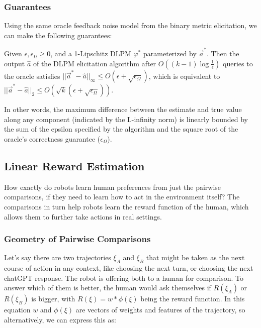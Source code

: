 \documentclass[
  letterpaper,
  numbers=noenddot,
  DIV=11]{scrreprt}
\theoremstyle{plain}
\theoremstyle{definition}
\theoremstyle{plain}
\theoremstyle{remark}
\begin{document}
\subsubsection*{Guarantees}\label{guarantees-1}

Using the same oracle feedback noise model from the binary metric
elicitation, we can make the following guarantees:

\begin{tcolorbox}[colframe=.grey, title=\faPenSquare \enspace Proposition]

\label{prop-prop_dlpm}
Given \(\epsilon, \epsilon_\Omega \geq 0\), and a 1-Lipschitz DLPM
\(\varphi^*\) parameterized by \(\vec{a}^*\). Then the output
\(\hat{a}\) of the DLPM elicitation algorithm after
\(O((k-1)\log\frac{1}{\epsilon})\) queries to the oracle satisfies
\(||\vec{a}^* - \hat{a}||_\infty \leq O(\epsilon + \sqrt{\epsilon_\Omega})\),
which is equivalent to
\(||\vec{a}^* - \hat{a}||_2 \leq O(\sqrt{k}(\epsilon + \sqrt{\epsilon_\Omega}))\).

\end{tcolorbox}

In other words, the maximum difference between the estimate and true
value along any component (indicated by the L-infinity norm) is linearly
bounded by the sum of the epsilon specified by the algorithm and the
square root of the oracle's correctness guarantee (\(\epsilon_\Omega\)).

\subsection{Linear Reward Estimation}\label{linear-reward-estimation}

How exactly do robots learn human preferences from just the pairwise
comparisons, if they need to learn how to act in the environment itself?
The comparisons in turn help robots learn the reward function of the
human, which allows them to further take actions in real settings.

\subsubsection*{Geometry of Pairwise
Comparisons}\label{geometry-of-pairwise-comparisons}

Let's say there are two trajectories \(\xi_A\) and \(\xi_B\) that might
be taken as the next course of action in any context, like choosing the
next turn, or choosing the next chatGPT response. The robot is offering
both to a human for comparison. To answer which of them is better, the
human would ask themselves if \(R(\xi_A)\) or \(R(\xi_B)\) is bigger,
with \(R(\xi) = w * \phi(\xi)\) being the reward function. In this
equation \(w\) and \(\phi(\xi)\) are vectors of weights and features of
the trajectory, so alternatively, we can express this as:
\end{document}
